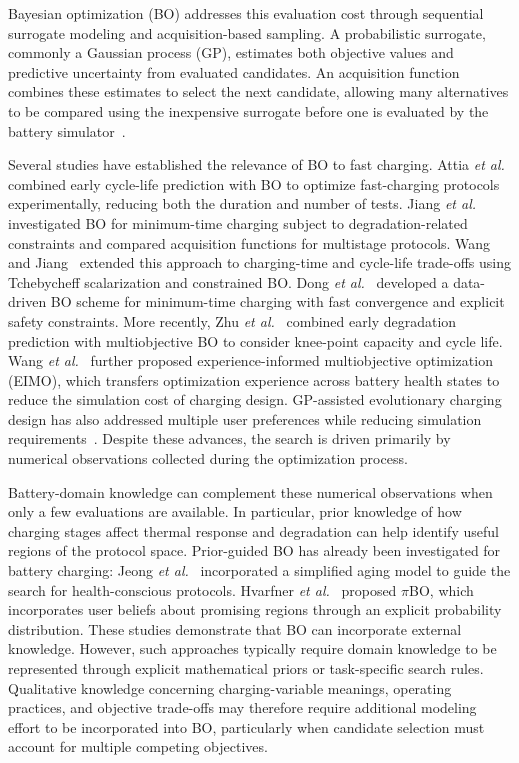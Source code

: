 \documentclass[journal]{IEEEtran}
\begin{document}
Bayesian optimization (BO) addresses this evaluation cost through sequential
surrogate modeling and acquisition-based sampling. A probabilistic surrogate,
commonly a Gaussian process (GP), estimates both objective values and predictive
uncertainty from evaluated candidates. An acquisition function combines these
estimates to select the next candidate, allowing many alternatives to be
compared using the inexpensive surrogate before one is evaluated by the battery
simulator~\cite{nref6}.

Several studies have established the relevance of BO to fast charging.
Attia \emph{et al.}~\cite{nref3} combined early cycle-life prediction with BO
to optimize fast-charging protocols experimentally, reducing both the duration
and number of tests. Jiang \emph{et al.}~\cite{nref7} investigated BO for
minimum-time charging subject to degradation-related constraints and compared
acquisition functions for multistage protocols. Wang and Jiang~\cite{nref8}
extended this approach to charging-time and cycle-life trade-offs using
Tchebycheff scalarization and constrained BO. Dong \emph{et al.}~\cite{refDongBO}
developed a data-driven BO scheme for minimum-time charging with fast
convergence and explicit safety constraints. More recently,
Zhu \emph{et al.}~\cite{refZhuMOBO} combined early degradation prediction with
multiobjective BO to consider knee-point capacity and cycle life.
Wang \emph{et al.}~\cite{refEIMO} further proposed experience-informed
multiobjective optimization (EIMO), which transfers optimization experience
across battery health states to reduce the simulation cost of charging design.
GP-assisted evolutionary charging design has also addressed multiple user
preferences while reducing simulation requirements~\cite{refGPA}. Despite
these advances, the search is driven primarily by numerical observations
collected during the optimization process.

Battery-domain knowledge can complement these numerical observations when only
a few evaluations are available. In particular, prior knowledge of how
charging stages affect thermal response and degradation can help identify
useful regions of the protocol space. Prior-guided BO has already been
investigated for battery charging: Jeong \emph{et al.}~\cite{refPriorCharging}
incorporated a simplified aging model to guide the search for health-conscious
protocols. Hvarfner \emph{et al.}~\cite{refPiBO} proposed $\pi$BO, which
incorporates user beliefs about promising regions through an explicit
probability distribution. These studies demonstrate that BO can incorporate
external knowledge. However, such approaches typically require domain
knowledge to be represented through explicit mathematical priors or
task-specific search rules. Qualitative knowledge concerning charging-variable
meanings, operating practices, and objective trade-offs may therefore require
additional modeling effort to be incorporated into BO, particularly when
candidate selection must account for multiple competing objectives.
\end{document}
